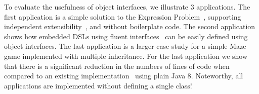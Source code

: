 

%




To evaluate the usefulness of object interfaces, we illustrate
3
applications. The first application is a simple 
solution to the Expression Problem~\cite{wadler98expression}, supporting independent 
extensibility~\cite{zenger05independentlyextensible}, and without boilerplate code. The second
application shows how embedded DSLs using fluent interfaces~\cite{fowler2005fluentinterface} 
can be easily defined using object interfaces. The last
application is a larger case study for a simple Maze game implemented with 
multiple inheritance. For the last application we show that there is a
significant reduction in the numbers of lines of code when compared 
to an existing implementation~\cite{bono14} using plain Java 8. 
Noteworthy, all applications are implemented 
without defining a single class!


